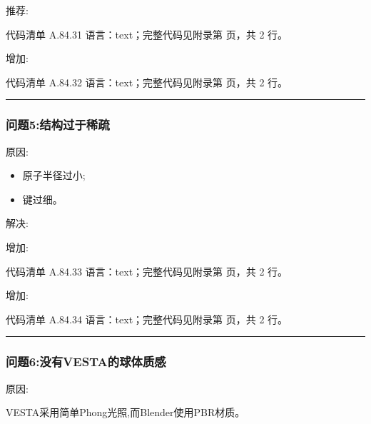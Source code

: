 \documentclass[lang=cn,scheme=chinese,color=blue,device=normal,toc=onecol,math=cm]{elegantbook}
\begin{document}
推荐:\par


\begin{codeindexbox}{代码清单 A.84.31}
语言：text；完整代码见附录第 \pageref{code:84:31} 页，共 2 行。
\end{codeindexbox}


增加:\par


\begin{codeindexbox}{代码清单 A.84.32}
语言：text；完整代码见附录第 \pageref{code:84:32} 页，共 2 行。
\end{codeindexbox}


\medskip\hrule\medskip


\subsubsection{问题5:结构过于稀疏}


原因:\par


\begin{itemize}
\item 原子半径过小;
\item 键过细。
\end{itemize}


解决:\par


增加:\par


\begin{codeindexbox}{代码清单 A.84.33}
语言：text；完整代码见附录第 \pageref{code:84:33} 页，共 2 行。
\end{codeindexbox}


增加:\par


\begin{codeindexbox}{代码清单 A.84.34}
语言：text；完整代码见附录第 \pageref{code:84:34} 页，共 2 行。
\end{codeindexbox}


\medskip\hrule\medskip


\subsubsection{问题6:没有VESTA的球体质感}


原因:\par


VESTA采用简单Phong光照,而Blender使用PBR材质。\par
\end{document}
